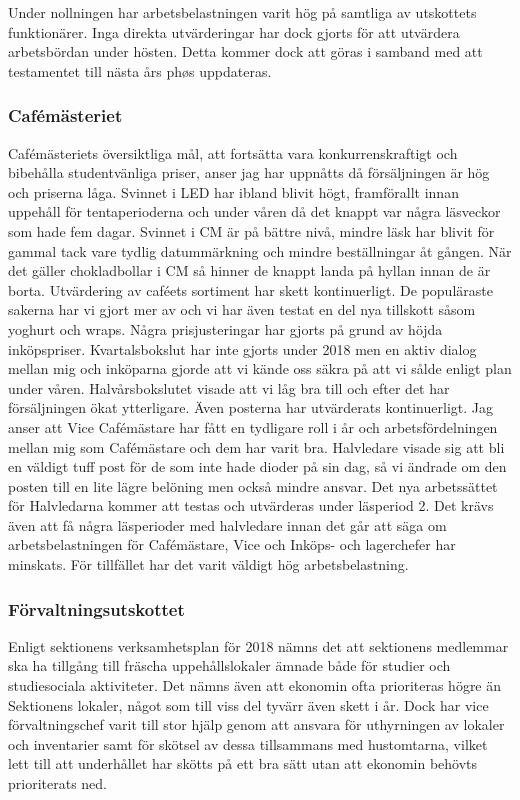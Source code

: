\documentclass[../_main/handlingar.tex]{subfiles}
\begin{document}
Under nollningen har arbetsbelastningen varit hög på samtliga av utskottets funktionärer. Inga direkta utvärderingar har dock gjorts för att utvärdera arbetsbördan under hösten. Detta kommer dock att göras i samband med att testamentet till nästa års phøs uppdateras.

\subsubsection*{Cafémästeriet}
Cafémästeriets översiktliga mål, att fortsätta vara konkurrenskraftigt och bibehålla studentvänliga priser, anser jag har uppnåtts då försäljningen är hög och priserna låga. Svinnet i LED har ibland blivit högt, framförallt innan uppehåll för tentaperioderna och under våren då det knappt var några läsveckor som hade fem dagar. Svinnet i CM är på bättre nivå, mindre läsk har blivit för gammal tack vare tydlig datummärkning och mindre beställningar åt gången. När det gäller chokladbollar i CM så hinner de knappt landa på hyllan innan de är borta. 
Utvärdering av caféets sortiment har skett kontinuerligt. De populäraste sakerna har vi gjort mer av och vi har även testat en del nya tillskott såsom yoghurt och wraps. Några prisjusteringar har gjorts på grund av höjda inköpspriser.
Kvartalsbokslut har inte gjorts under 2018 men en aktiv dialog mellan mig och inköparna gjorde att vi kände oss säkra på att vi sålde enligt plan under våren. Halvårsbokslutet visade att vi låg bra till och efter det har försäljningen ökat ytterligare. 
Även posterna har utvärderats kontinuerligt. Jag anser att Vice Cafémästare har fått en tydligare roll i år och arbetsfördelningen mellan mig som Cafémästare och dem har varit bra. Halvledare visade sig att bli en väldigt tuff post för de som inte hade dioder på sin dag, så vi ändrade om den posten till en lite lägre belöning men också mindre ansvar. Det nya arbetssättet för  Halvledarna kommer att testas och utvärderas under läsperiod 2. Det krävs även att få några läsperioder med halvledare innan det går att säga om arbetsbelastningen för Cafémästare, Vice och Inköps- och lagerchefer har minskats. För tillfället har det varit väldigt hög arbetsbelastning.
\subsubsection*{Förvaltningsutskottet}
Enligt sektionens verksamhetsplan för 2018 nämns det att sektionens medlemmar ska ha tillgång till fräscha uppehållslokaler ämnade både för studier och studiesociala aktiviteter. Det nämns även att ekonomin ofta prioriteras högre än Sektionens lokaler, något som till viss del tyvärr även skett i år. Dock har vice förvaltningschef varit till stor hjälp genom att ansvara för uthyrningen av lokaler och inventarier samt för skötsel av dessa tillsammans med hustomtarna, vilket lett till att underhållet har skötts på ett bra sätt utan att ekonomin behövts prioriterats ned. 
\end{document}
